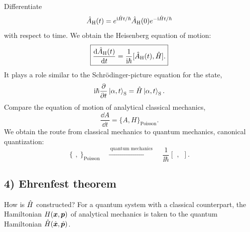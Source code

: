 Differentiate
\begin{equation}
\hat{A}_{\mathrm H}(t)=e^{\mathrm{i}\hat{H}t/\hbar}\hat{A}_{\mathrm H}(0)e^{-\mathrm{i}\hat{H}t/\hbar}
\end{equation}
with respect to time. We obtain the Heisenberg equation of motion:
\begin{equation}
\boxed{\frac{\mathrm{d}\hat{A}_{\mathrm H}(t)}{\mathrm{d} t}
=\frac1{\mathrm{i}\hbar}[\hat{A}_{\mathrm H}(t),\hat{H}].}
\end{equation}
It plays a role similar to the Schr\"odinger-picture equation for the state,
\begin{equation}
\mathrm{i}\hbar\frac{\partial}{\partial t}\left|\alpha,t\right\rangle_{\mathrm S}
=\hat{H}\left|\alpha,t\right\rangle_{\mathrm S}.
\end{equation}
Compare the equation of motion of analytical classical mechanics,
\begin{equation}
\frac{\dd A}{\dd t}=\{A,H\}_{\mathrm{Poisson}}.
\end{equation}
We obtain the route from classical mechanics to quantum mechanics, canonical quantization:
\begin{equation}
\boxed{\{\ \,,\ \}_{\mathrm{Poisson}}\quad
\xrightarrow{\ \text{quantum mechanics}\ }\quad
\frac1{\ii\hbar}[\ \,,\ \ ].}
\end{equation}

\subsection*{4) Ehrenfest theorem}
How is $\hat{H}$ constructed? For a quantum system with a classical counterpart, the Hamiltonian $H(\bm{x},\bm{p})$ of analytical mechanics is taken to the quantum Hamiltonian $\hat{H}(\hat{\bm{x}},\hat{\bm{p}})$.

